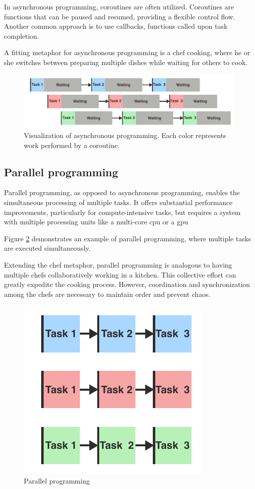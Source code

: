 In asynchronous programming, coroutines are often utilized.
Coroutines are functions that can be paused and resumed, providing a flexible control flow.
Another common approach is to use callbacks, functions called upon task completion.

A fitting metaphor for asynchronous programming is a chef cooking, where he or she switches between preparing multiple dishes while waiting for others to cook.


\begin{figure}[H]
    \centering
    \includegraphics[width=\textwidth]{figures/concurrency/concurrent.pdf}
    \caption{Visualization of asynchronous programming.
        Each color represents work performed by a coroutine.}
    \label{fig:concurrency_concurrent}
\end{figure}


\subsection{Parallel programming}
Parallel programming, as opposed to asynchronous programming, enables the simultaneous processing of multiple tasks.
It offers substantial performance improvements, particularly for compute-intensive tasks, but requires a system with multiple processing units like a multi-core \gls{cpu} or a \gls{gpu}

Figure \ref{fig:concurrency_parallel} demonstrates an example of parallel programming, where multiple tasks are executed simultaneously.

Extending the chef metaphor, parallel programming is analogous to having multiple chefs collaboratively working in a kitchen.
This collective effort can greatly expedite the cooking process.
However, coordination and synchronization among the chefs are necessary to maintain order and prevent chaos.

\begin{figure}[H]
    \centering
    \includegraphics[width=.33\textwidth]{figures/concurrency/paralell.pdf}
    \caption{Parallel programming}
    \label{fig:concurrency_parallel}
\end{figure}


